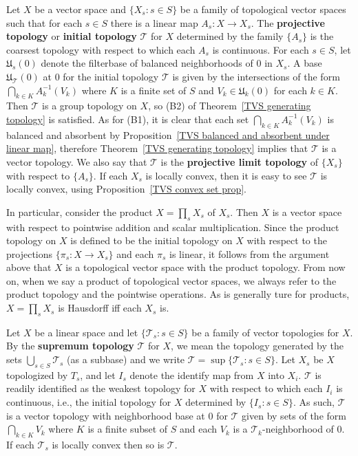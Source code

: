 \begin{example}\label{TVS initial topo}
Let $X$ be a vector space and $\{X_s:s\in S\}$ be a family of topological vector spaces such that for each $s\in S$ there is a linear map $A_s:X\to X_s$. The \textbf{projective topology} or \textbf{initial topology} $\mathcal{T}$ for $X$ determined by the family $\{A_s\}$ is the coarsest topology with respect to which each $A_s$ is continuous. For each $s\in S$, let $\mathfrak{U}_s(0)$ denote the filterbase of balanced neighborhoods of $0$ in $X_s$. A base $\mathfrak{U}_{\mathcal{T}}(0)$ at $0$ for the initial topology $\mathcal{T}$ is given by the intersections of the form $\bigcap_{k\in K}A_k^{-1}(V_k)$ where $K$ is a finite set of $S$ and $V_k\in\mathfrak{U}_k(0)$ for each $k\in K$. Then $\mathcal{T}$ is a group topology on $X$, so (B2) of Theorem~\ref{TVS generating topology} is satisfied. As for (B1), it is clear that each set $\bigcap_{k\in K}A_k^{-1}(V_k)$ is balanced and absorbent by Proposition~\ref{TVS balanced and absorbent under linear map}, therefore Theorem~\ref{TVS generating topology} implies that $\mathcal{T}$ is a vector topology. We also say that $\mathcal{T}$ is the \textbf{projective limit topology} of $\{X_s\}$ with respect to $\{A_s\}$. If each $X_s$ is locally convex, then it is easy to see $\mathcal{T}$ is locally convex, using Proposition~\ref{TVS convex set prop}.
\end{example}
\begin{example}
In particular, consider the product $X=\prod_sX_s$ of $X_s$. Then $X$ is a vector space with respect to pointwise addition and scalar multiplication. Since the product topology on $X$ is defined to be the initial topology on $X$ with respect to the projections $\{\pi_s:X\to X_s\}$ and each $\pi_s$ is linear, it follows from the argument above that $X$ is a topological vector space with the product topology. From now on, when we say a product of topological vector spaces, we always refer to the product topology and the pointwise operations. As is generally ture for products, $X=\prod_sX_s$ is Hausdorff iff each $X_s$ is.
\end{example}
\begin{example}\label{TVS supremum topo}
Let $X$ be a linear space and let $\{\mathcal{T}_s:s\in S\}$ be a family of vector topologies for $X$. By the \textbf{supremum topology} $\mathcal{T}$ for $X$, we mean the topology generated by the sets $\bigcup_{s\in S}\mathcal{T}_s$ (as a subbase) and we write $\mathcal{T}=\sup\{\mathcal{T}_s:s\in S\}$. Let $X_s$ be $X$ topologized by $T_s$, and let $I_s$ denote the identify map from $X$ into $X_i$. $\mathcal{T}$ is readily identified as the weakest topology for $X$ with respect to which each $I_i$ is continuous, i.e., the initial topology for $X$ determined by $\{I_s:s\in S\}$. As such, $\mathcal{T}$ is a vector topology with neighborhood base at $0$ for $\mathcal{T}$ given by sets of the form $\bigcap_{k\in K}V_k$ where $K$ is a finite subset of $S$ and each $V_k$ is a $\mathcal{T}_k$-neighborhood of $0$. If each $\mathcal{T}_s$ is locally convex then so is $\mathcal{T}$.
\end{example}
